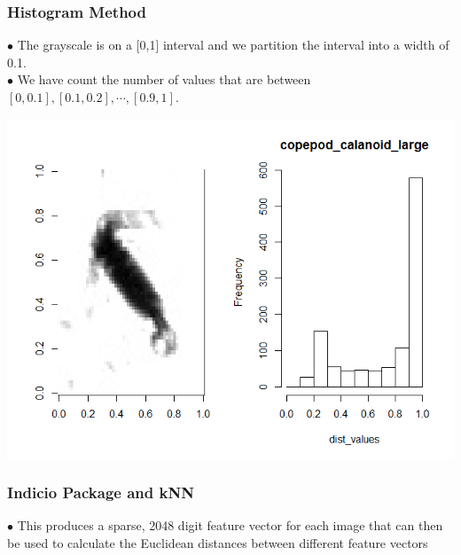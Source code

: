 \documentclass{beamer}
\begin{document}
\begin{frame}
	\frametitle{Histogram Method}
	$\bullet$ The grayscale is on a [0,1] interval and we partition the interval into a width of 0.1.\\
	$\bullet$ We have count the number of values that are between $[0,0.1],[0.1,0.2],\cdots, [0.9,1]$.\\ 
	\begin{center}
		\includegraphics[scale=0.3]{bin_method.png}
	\end{center}
\end{frame}
\begin{frame}
\frametitle{Indicio Package and kNN}
$\bullet$ This produces a sparse, 2048 digit feature vector for each image that can then be used to calculate the Euclidean distances between different feature vectors
\end{frame}

\end{document}
